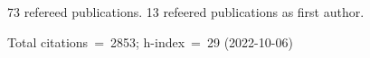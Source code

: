 73 refereed publications. 13 refeered publications as first author.

Total citations~=~2853; h-index~=~29 (2022-10-06)